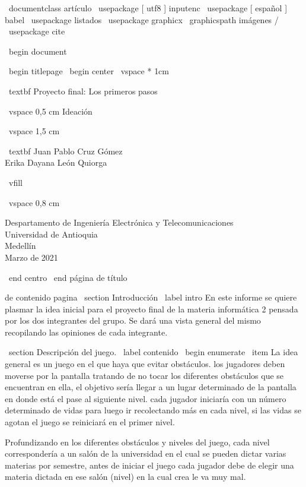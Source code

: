 \ documentclass { artículo }
	\ usepackage [ utf8 ] { inputenc }
	\ usepackage [ español ] { babel }
	\ usepackage { listados }
	\ usepackage { graphicx }
	\ graphicspath {{imágenes /}}
	\ usepackage { cite }
	

	\ begin { document }
	

	\ begin { titlepage }
	    \ begin { center }
	        \ vspace * {1cm}
	            
	        \Enorme
	        \ textbf { Proyecto final: Los primeros pasos }
	            
	        \ vspace {0,5 cm}
	        \GRANDE
	        Ideación
	            
	        \ vspace {1,5 cm}
	            
	        \ textbf { Juan Pablo Cruz Gómez \\
	                Erika Dayana León Quiorga }
	            
	        \ vfill
	            
	        \ vspace {0,8 cm}
	            
	        \Grande
	        Despartamento de Ingeniería Electrónica y Telecomunicaciones \\
	        Universidad de Antioquia \\
	        Medellín \\
	        Marzo de 2021
	            
	    \ end { centro }
	\ end { página de título }
	

	\Tabla de contenido
	\nueva pagina
	\ section { Introducción } \ label { intro }
	En este informe se quiere plasmar la idea inicial para el proyecto final de la materia informática 2 pensada por los dos integrantes del grupo. Se dará una vista general del mismo recopilando las opiniones de cada integrante.
	

	\ section { Descripción del juego. } \ label { contenido }
	\ begin { enumerate }
	  \ item La idea general es un juego en el que haya que evitar obstáculos. los jugadores deben moverse por la pantalla tratando de no tocar los diferentes obstáculos que se encuentran en ella, el objetivo sería llegar a un lugar determinado de la pantalla en donde está el pase al siguiente nivel. cada jugador iniciaría con un número determinado de vidas para luego ir recolectando más en cada nivel, si las vidas se agotan el juego se reiniciará en el primer nivel.

Profundizando en los diferentes obstáculos y niveles del juego,
cada nivel correspondería a un salón de la universidad en el cual se pueden dictar varias materias por semestre, antes de iniciar el juego cada jugador debe de elegir una materia dictada en ese salón (nivel) en la cual crea le va muy mal.

